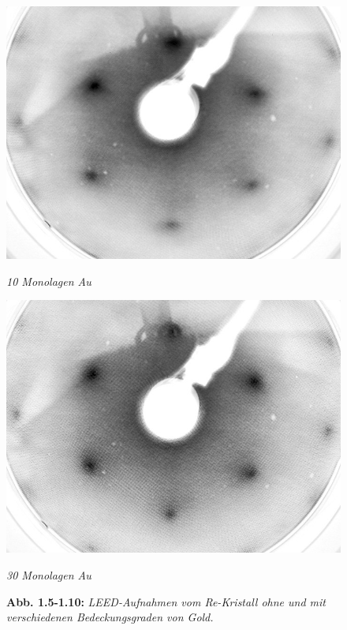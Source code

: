 \begin{figure}[htbp]
	\begin{minipage}[b]{0.5\textwidth} 
		\includegraphics[width=\textwidth]{LEED-Bilder/bearbeitet/10ML_E207}
		\caption{\textit{10 Monolagen Au}}
		\label{10ML} 
	\end{minipage}
	\hfill
	\begin{minipage}[b]{0.5\textwidth}
		\includegraphics[width=\textwidth]{LEED-Bilder/bearbeitet/30ML_E208}
		\caption{\textit{30 Monolagen Au}}
		\label{30ML} 
	\end{minipage}
	\caption*{\textbf{Abb. 1.5-1.10:} \textit{LEED-Aufnahmen vom Re-Kristall ohne und mit
	verschiedenen Bedeckungsgraden von Gold.}}
\end{figure}


\FloatBarrier